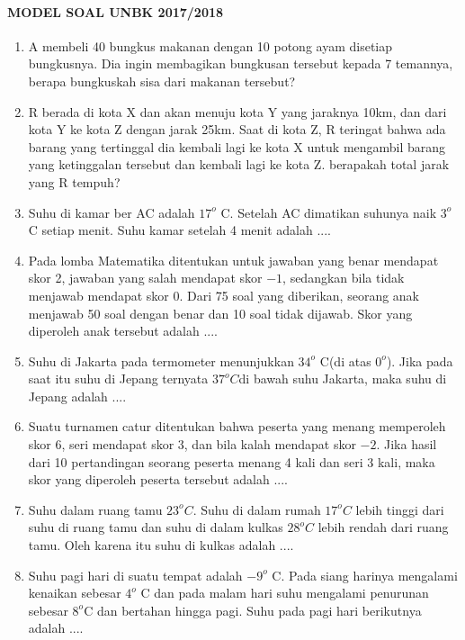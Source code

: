 \paragraph{MODEL SOAL UNBK 2017/2018}
\begin{enumerate}
	\item A membeli 40 bungkus makanan dengan 10 potong ayam disetiap bungkusnya. Dia ingin membagikan bungkusan tersebut kepada 7 temannya, berapa bungkuskah sisa dari makanan tersebut?
	\item R berada di kota X dan akan menuju kota Y yang jaraknya 10km, dan dari kota Y ke kota Z dengan jarak 25km. Saat di kota Z, R teringat bahwa ada barang yang tertinggal dia kembali lagi ke kota X untuk mengambil barang yang ketinggalan tersebut dan kembali lagi ke kota Z. berapakah total jarak yang R tempuh?
	\item Suhu di kamar ber AC adalah $17^o$ C. Setelah
	AC dimatikan suhunya naik $3^o$ C setiap menit.
	Suhu kamar setelah 4 menit adalah ....
	\item Pada lomba Matematika ditentukan untuk
	jawaban yang benar mendapat skor 2,
	jawaban yang salah mendapat skor $-1$,
	sedangkan bila tidak menjawab mendapat
	skor 0. Dari 75 soal yang diberikan, seorang
	anak menjawab 50 soal dengan benar dan 10
	soal tidak dijawab. Skor yang diperoleh anak
	tersebut adalah ....
	\item Suhu di Jakarta
	pada termometer menunjukkan $34^o$ C(di atas $0^o$). Jika pada saat itu suhu di Jepang ternyata $37^o C$di bawah suhu Jakarta, maka suhu di Jepang adalah ....
	\item Suatu turnamen catur ditentukan bahwa
	peserta yang menang memperoleh skor 6, seri
	mendapat skor 3, dan bila kalah mendapat
	skor $-2$. Jika hasil dari 10 pertandingan
	seorang peserta menang 4 kali dan seri 3 kali,
	maka skor yang diperoleh peserta tersebut
	adalah ....
	\item Suhu dalam ruang tamu $23^o C$. Suhu di dalam rumah $17^o C$ lebih tinggi dari suhu di ruang tamu dan suhu di dalam kulkas $28^o C$ lebih rendah dari ruang tamu. Oleh karena itu suhu di kulkas adalah ....
	
	\item Suhu pagi hari di suatu tempat adalah $-9^o$ C.
	Pada siang harinya mengalami kenaikan
	sebesar $4^o$ C dan pada malam hari suhu
	mengalami penurunan sebesar $8^o$C dan
	bertahan hingga pagi. Suhu pada pagi hari
	berikutnya adalah ....
\end{enumerate}
		
		
		
		
		
		
		
		
		
		